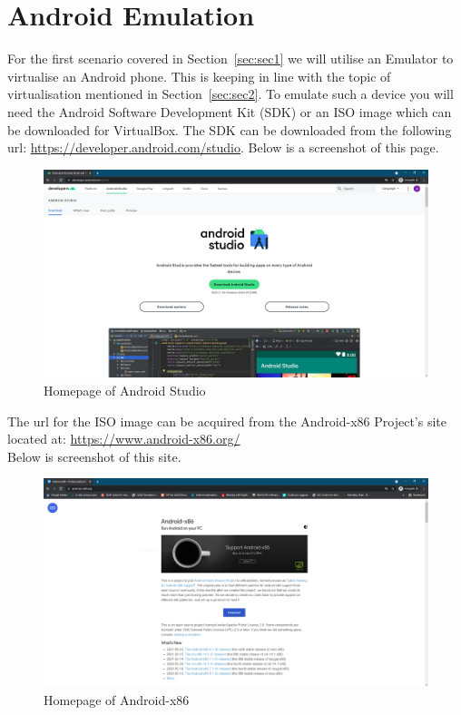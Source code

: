 \documentclass[a4paper, 12pt, titlepage]{report}
\begin{document}
\section{Android Emulation}
For the first scenario covered in Section~\ref{sec:sec1} we will utilise an Emulator to virtualise an Android phone. This is keeping in line with the topic of virtualisation mentioned in Section~\ref{sec:sec2}. To emulate such a device you will need the Android Software Development Kit (SDK) or an ISO image which can be downloaded for VirtualBox. The SDK can be downloaded from the following url: \url{https://developer.android.com/studio}. Below is a screenshot of this page.
\begin{figure}[H]
    \centering
    \includegraphics[scale=0.4]{pics/as1.PNG}
    \caption{Homepage of Android Studio}
\end{figure}
The url for the ISO image can be acquired from the Android-x86 Project's site located at: \url{https://www.android-x86.org/}\\
Below is screenshot of this site.
\begin{figure}[H]
    \centering
    \includegraphics[scale=0.5]{pics/andro-proj.PNG}
    \caption{Homepage of Android-x86}
\end{figure}
\end{document}
